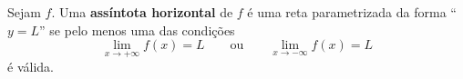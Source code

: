 \begin{definition}
	Sejam $f$. Uma \textbf{assíntota horizontal} de $f$ é uma reta parametrizada da forma ``$y=L$'' se pelo menos uma das condições
	\[\lim_{x\to+\infty}f(x)=L\qquad\text{ou}\qquad\lim_{x\to-\infty}f(x)=L\]
	é válida.
\end{definition}